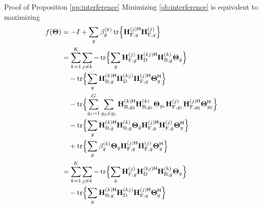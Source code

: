 \documentclass[journal]{IEEEtran}
\begin{document}
\begin{appendix}
	\begin{subsection}{Proof of Proposition \ref{pp:interference}}
		\label{ap:interference}
		Minimizing \eqref{ob:interference} is equivalent to maximizing
		\begin{align*}
			f(\mathbf{\Theta}) & = - I + \sum_g \beta_g^{(k)} \tr \Bigl\{ \mathbf{H}_{\mathrm{F},g}^{(j)\mathsf{H}} \mathbf{H}_{\mathrm{F},g}^{(j)} \Bigr\} \\
			& = \sum_{k=1}^K \sum_{j \ne k} - \tr \Bigl\{ \sum_g \mathbf{H}_{\mathrm{F},g}^{(j)} \mathbf{H}_{\mathrm{D}}^{(kj)\mathsf{H}} \mathbf{H}_{\mathrm{B},g}^{(k)} \mathbf{\Theta}_g\Bigr\} \\
			& \quad - \tr \Bigl\{ \sum_g \mathbf{H}_{\mathrm{B},g}^{(k)\mathsf{H}} \mathbf{H}_{\mathrm{D}}^{(kj)} \mathbf{H}_{\mathrm{F},g}^{(j)\mathsf{H}} \mathbf{\Theta}_g^\mathsf{H} \Bigr\} \\
			& \quad - \tr \Bigl\{ \sum_{g_1=1}^G \sum_{g_2 \ne g_1} \mathbf{H}_{\mathrm{B},g_2}^{(k)\mathsf{H}} \mathbf{H}_{\mathrm{B},g_1}^{(k)} \mathbf{\Theta}_{g_1} \mathbf{H}_{\mathrm{F},g_1}^{(j)} \mathbf{H}_{\mathrm{F},g_2}^{(j)\mathsf{H}} \mathbf{\Theta}_{g_2}^\mathsf{H}\Bigr\} \\
			& \quad - \tr \Bigl\{ \sum_g \mathbf{H}_{\mathrm{B},g}^{(k)\mathsf{H}} \mathbf{H}_{\mathrm{B},g}^{(k)} \mathbf{\Theta}_{g} \mathbf{H}_{\mathrm{F},g}^{(j)\mathsf{H}} \mathbf{H}_{\mathrm{F},g}^{(j)} \mathbf{\Theta}_{g}^\mathsf{H} \Bigr\} \\
			& \quad + \tr \Bigl\{ \sum_g \beta_g^{(k)} \mathbf{\Theta}_{g} \mathbf{H}_{\mathrm{F},g}^{(j)\mathsf{H}} \mathbf{H}_{\mathrm{F},g}^{(j)} \mathbf{\Theta}_{g}^\mathsf{H} \Bigr\} \\
			& = \sum_{k=1}^K \sum_{j \ne k} - \tr \Bigl\{ \sum_g \mathbf{H}_{\mathrm{F},g}^{(j)} \mathbf{H}_{\mathrm{D}}^{(kj)\mathsf{H}} \mathbf{H}_{\mathrm{B},g}^{(k)} \mathbf{\Theta}_g\Bigr\} \\
			& \quad - \tr \Bigl\{ \sum_g \mathbf{H}_{\mathrm{B},g}^{(k)\mathsf{H}} \mathbf{H}_{\mathrm{D}}^{(kj)} \mathbf{H}_{\mathrm{F},g}^{(j)\mathsf{H}} \mathbf{\Theta}_g^\mathsf{H} \Bigr\} \\

\end{align*}
\end{subsection}
\end{appendix}
\end{document}
